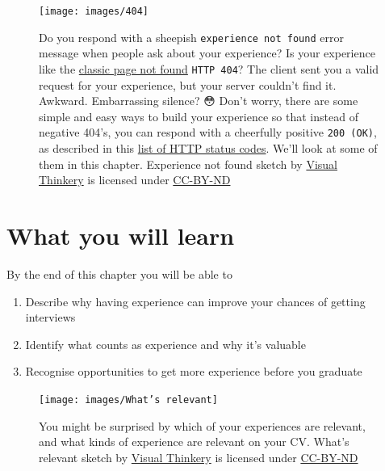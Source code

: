 \documentclass[
]{book}
\providecommand{\tightlist}{%
  \setlength{\itemsep}{0pt}\setlength{\parskip}{0pt}}
\begin{document}
\begin{figure}

{\centering \texttt{[image: images/404]} 

}

\caption{Do you respond with a sheepish \texttt{experience\ not\ found} error message when people ask about your experience? Is your experience like the \href{https://en.wikipedia.org/wiki/HTTP_404}{classic page not found} \texttt{HTTP\ 404}? The client sent you a valid request for your experience, but your server couldn't find it. Awkward. Embarrassing silence? 😳 Don't worry, there are some simple and easy ways to build your experience so that instead of negative 404's, you can respond with a cheerfully positive \texttt{200\ (OK)}, as described in this \href{https://en.wikipedia.org/wiki/List_of_HTTP_status_codes}{list of HTTP status codes}. We'll look at some of them in this chapter. Experience not found sketch by \href{https://visualthinkery.com/}{Visual Thinkery} is licensed under \href{https://creativecommons.org/licenses/by-nd/4.0/}{CC-BY-ND}}\label{fig:404-fig}
\end{figure}



\hypertarget{ilo5}{%
\section{What you will learn}\label{ilo5}}

By the end of this chapter you will be able to

\begin{enumerate}
\def\labelenumi{\arabic{enumi}.}
\tightlist
\item
  Describe why having experience can improve your chances of getting interviews
\item
  Identify what counts as experience and why it's valuable
\item
  Recognise opportunities to get more experience before you graduate
\end{enumerate}

\begin{figure}

{\centering \texttt{[image: images/What's relevant]} 

}

\caption{You might be surprised by which of your experiences are relevant, and what kinds of experience are relevant on your CV. What's relevant sketch by \href{https://visualthinkery.com/}{Visual Thinkery} is licensed under \href{https://creativecommons.org/licenses/by-nd/4.0/}{CC-BY-ND}}\label{fig:relevance-fig}
\end{figure}
\end{document}
